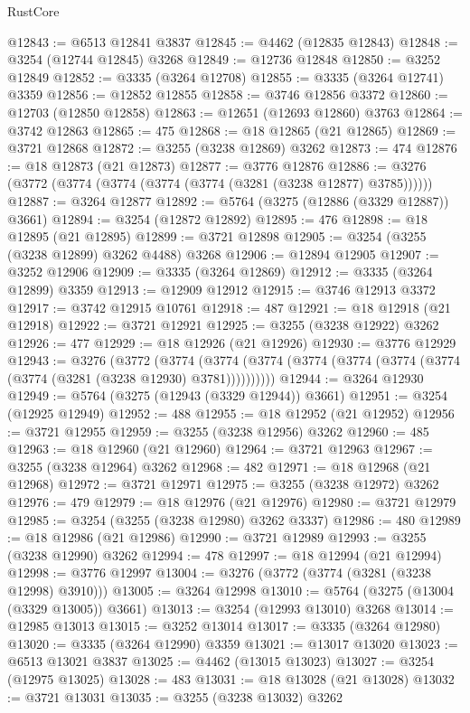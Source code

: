 \begin{lexlean}{RustCore}
\begin{coremodule}
@12843 := @6513 @12841 @3837
@12845 := @4462 (@12835 @12843)
@12848 := @3254 (@12744 @12845) @3268
@12849 := @12736 @12848
@12850 := @3252 @12849
@12852 := @3335 (@3264 @12708)
@12855 := @3335 (@3264 @12741) @3359
@12856 := @12852 @12855
@12858 := @3746 @12856 @3372
@12860 := @12703 (@12850 @12858)
@12863 := @12651 (@12693 @12860) @3763
@12864 := @3742 @12863
@12865 := 475
@12868 := @18 @12865 (@21 @12865)
@12869 := @3721 @12868
@12872 := @3255 (@3238 @12869) @3262
@12873 := 474
@12876 := @18 @12873 (@21 @12873)
@12877 := @3776 @12876
@12886 := @3276 (@3772 (@3774 (@3774 (@3774 (@3774 (@3281 (@3238 @12877) @3785))))))
@12887 := @3264 @12877
@12892 := @5764 (@3275 (@12886 (@3329 @12887)) @3661)
@12894 := @3254 (@12872 @12892)
@12895 := 476
@12898 := @18 @12895 (@21 @12895)
@12899 := @3721 @12898
@12905 := @3254 (@3255 (@3238 @12899) @3262 @4488) @3268
@12906 := @12894 @12905
@12907 := @3252 @12906
@12909 := @3335 (@3264 @12869)
@12912 := @3335 (@3264 @12899) @3359
@12913 := @12909 @12912
@12915 := @3746 @12913 @3372
@12917 := @3742 @12915 @10761
@12918 := 487
@12921 := @18 @12918 (@21 @12918)
@12922 := @3721 @12921
@12925 := @3255 (@3238 @12922) @3262
@12926 := 477
@12929 := @18 @12926 (@21 @12926)
@12930 := @3776 @12929
@12943 := @3276
    (@3772
      (@3774 (@3774 (@3774 (@3774 (@3774 (@3774 (@3774 (@3774 (@3281 (@3238 @12930) @3781))))))))))
@12944 := @3264 @12930
@12949 := @5764 (@3275 (@12943 (@3329 @12944)) @3661)
@12951 := @3254 (@12925 @12949)
@12952 := 488
@12955 := @18 @12952 (@21 @12952)
@12956 := @3721 @12955
@12959 := @3255 (@3238 @12956) @3262
@12960 := 485
@12963 := @18 @12960 (@21 @12960)
@12964 := @3721 @12963
@12967 := @3255 (@3238 @12964) @3262
@12968 := 482
@12971 := @18 @12968 (@21 @12968)
@12972 := @3721 @12971
@12975 := @3255 (@3238 @12972) @3262
@12976 := 479
@12979 := @18 @12976 (@21 @12976)
@12980 := @3721 @12979
@12985 := @3254 (@3255 (@3238 @12980) @3262 @3337)
@12986 := 480
@12989 := @18 @12986 (@21 @12986)
@12990 := @3721 @12989
@12993 := @3255 (@3238 @12990) @3262
@12994 := 478
@12997 := @18 @12994 (@21 @12994)
@12998 := @3776 @12997
@13004 := @3276 (@3772 (@3774 (@3281 (@3238 @12998) @3910)))
@13005 := @3264 @12998
@13010 := @5764 (@3275 (@13004 (@3329 @13005)) @3661)
@13013 := @3254 (@12993 @13010) @3268
@13014 := @12985 @13013
@13015 := @3252 @13014
@13017 := @3335 (@3264 @12980)
@13020 := @3335 (@3264 @12990) @3359
@13021 := @13017 @13020
@13023 := @6513 @13021 @3837
@13025 := @4462 (@13015 @13023)
@13027 := @3254 (@12975 @13025)
@13028 := 483
@13031 := @18 @13028 (@21 @13028)
@13032 := @3721 @13031
@13035 := @3255 (@3238 @13032) @3262

\end{coremodule}
\end{lexlean}
